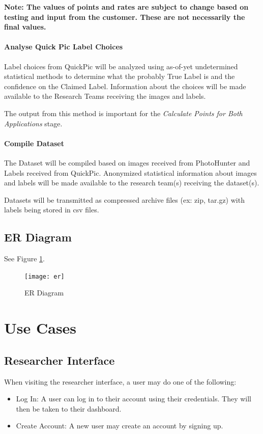\documentclass{article}
\begin{document}
\textbf{Note: The values of points and rates are subject to change based on
  testing and input from the customer.  These are not necessarily the final
values.}

\paragraph{Analyse Quick Pic Label Choices}

Label choices from QuickPic will be analyzed using as-of-yet undetermined
statistical methods to determine what the probably True Label is and the
confidence on the Claimed Label.  Information about the choices will be made
available to the Research Teams receiving the images and labels.

The output from this method is important for the \textit{Calculate Points for
Both Applications} stage.

\paragraph{Compile Dataset}

The Dataset will be compiled based on images received from PhotoHunter and
Labels received from QuickPic.  Anonymized statistical information about images
and labels will be made available to the research team(s) receiving the
dataset(s).

Datasets will be transmitted as compressed archive files (ex: zip, tar.gz) with
labels being stored in csv files.

\subsection{ER Diagram}

See Figure \ref{er}.

\begin{figure}
  \centering
  \texttt{[image: er]}
  \caption{ER Diagram}
  \label{er}
\end{figure}

\section{Use Cases}
\subsection{Researcher Interface}
When visiting the researcher interface, a user may do one of the following:
\begin{itemize}
  \item Log In: A user can log in to their account using their credentials. They will then be taken to their dashboard.
  \item Create Account: A new user may create an account by signing up.
\end{itemize}
\end{document}
